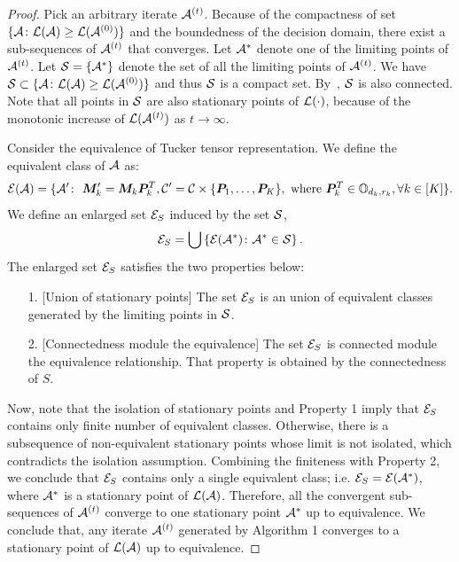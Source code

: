 \documentclass[11pt]{article}
\theoremstyle{plain}
\theoremstyle{definition}
\begin{document}
\begin{proof}

Pick an arbitrary iterate $\mathcal{A}^{(t)}$.  Because of the compactness of set $\{\mathcal{A}\colon  \mathcal{L}(\mathcal{A}) \geq \mathcal{L}(\mathcal{A}^{(0)}) \}$ and the boundedness of the decision domain, there exist a sub-sequences of $\mathcal{A}^{(t)}$ that converges. Let $\mathcal{A}^*$ denote one of the limiting points of $\mathcal{A}^{(t)}$. Let $\mathcal{S} = \{\mathcal{A}^*\}$ denote the set of all the limiting points of $\mathcal{A}^{(t)}$. We have $\mathcal{S} \subset \{\mathcal{A}\colon  \mathcal{L}(\mathcal{A}) \geq \mathcal{L}(\mathcal{A}^{(0)}) \}$ and thus $\mathcal{S}$ is a compact set. By~\cite[Propositions 8.2.1 and 13.4.2]{Lange:2012:NAS:2432073}, $\mathcal{S}$ is also connected. Note that all points in $\mathcal{S}$ are also stationary points of $\mathcal{L}(\cdot)$, because of the monotonic increase of $\mathcal{L}(\mathcal{A}^{(t)})$ as $t \rightarrow \infty$. 
 
 
 Consider the equivalence of Tucker tensor representation. We define the equivalent class of $\mathcal{A}$ as:
\begin{equation}
 	\mathcal{E}(\mathcal{A}) = \{ \mathcal{A}'\colon \ \bm M'_k = \bm M_k\bm{P}^T_k, \mathcal{C}' = \mathcal{C} \times \{\bm{P}_1,\ldots,\bm{P}_K\}, \text{ where } \bm{P}^T_k \in \mathbb{O}_{d_k, r_k}, \forall k \in [K] \}.
\end{equation}
We define an enlarged set $\mathcal{E}_S$ induced by the set $\mathcal{S}$, 
\begin{equation}
 \mathcal{E}_S = \bigcup\left\{ \mathcal{E}(\mathcal{A}^*)\colon \mathcal{A}^*\in\mathcal{S}\right\}.
\end{equation}
The enlarged set $\mathcal{E}_S$ satisfies the two properties below:
 \begin{enumerate}
\item [1.] [Union of stationary points] The set $\mathcal{E}_S$ is an union of equivalent  classes generated by the limiting points in $\mathcal{S}$.
\item [2.] [Connectedness module the equivalence]  The set $\mathcal{E}_S$ is connected module the equivalence relationship. That property is obtained by the connectedness of $S$.
 \end{enumerate}
Now, note that the isolation of stationary points and Property 1 imply that $\mathcal{E}_S$ contains only finite number of equivalent classes. Otherwise, there is a subsequence of non-equivalent stationary points whose limit is not isolated, which contradicts the isolation assumption. Combining the finiteness with Property 2, we conclude that $\mathcal{E}_S$ contains only a single equivalent class; i.e. $\mathcal{E}_S = \mathcal{E}(\mathcal{A}^*)$, where $\mathcal{A}^*$ is a stationary point of $\mathcal{L}(\mathcal{A})$. Therefore, all the convergent sub-sequences of $\mathcal{A}^{(t)}$ converge to one stationary point $\mathcal{A}^*$ up to equivalence. We conclude that, any iterate $\mathcal{A}^{(t)}$ generated by Algorithm 1 converges to a stationary point of $\mathcal{L}(\mathcal{A})$ up to equivalence.
 \end{proof}
\end{document}
